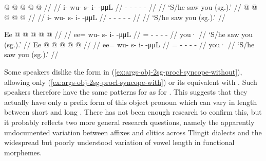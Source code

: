 \pex\label{exx:args-obj-2sg-pfx-syncope}%
\a\label{ex:args-obj-2sg-pfx-syncope-with}%
\exmn{= \ref{exx:args-obj-1pl-sync-2sg}}%
%
\begingl
	\gla	{} @ {} @ {} @ {} @ {} @ {} //
	\glp	\llap{[}\rlap{\ipa{ʔì\gm{w}.sì.ˈtʰìːn}]} {} {} {} {} {} //
	\glb	i- wu- s- i-  -μμL //
	\glc	{}- - - -  - //
	\gld	{} {} {} {} {} {} //
	\glft	‘S/he saw you (sg.).’
		//
\endgl
\a\label{ex:args-obj-2sg-pfx-syncope-without}%
%
\ljudge{*}%
\begingl
	\gla	{} @ {} @ {} @ {} @ {} @ {} //
	\glp	\llap{[}\rlap{\ipa{ʔì.\gm{wù}.sì.ˈtʰìːn}]} {} {} {} {} {} //
	\glb	i- wu- s- i-  -μμL //
	\glc	{}- - - -  - //
	\gld	{} {} {} {} {} {} //
	\glft	‘S/he saw you (sg.).’
		//
\endgl
\xe

\pex\label{exx:args-obj-2sg-procl-syncope}%
\a\label{ex:args-obj-2sg-procl-syncope-with}%
%
\begingl
	\gla	Ee @  @ {} @ {} @ {} @ {} //
	\glp	\llap{[}\rlap{\ipa{ʔìː\gm{w}.sì.ˈtʰìːn}]} {} {} {} {} //
	\glb	ee= wu- s- i-  -μμL //
	\glc	{}= - - -  - //
	\gld	you·  {} {} {} {} //
	\glft	‘S/he saw you (sg.).’
		//
\endgl
\a\label{ex:args-obj-2sg-procl-syncope-without}%
%
\begingl
	\gla	Ee @  @ {} @ {} @ {} @ {} //
	\glp	\llap{[}\rlap{\ipa{ʔìː.\gm{wù}.sì.ˈtʰìːn}]} {} {} {} {} //
	\glb	ee= wu- s- i-  -μμL //
	\glc	{}= - - -  - //
	\gld	you·  {} {} {} {} //
	\glft	‘S/he saw you (sg.).’
		//
\endgl
\xe

Some speakers dislike the form in (\ref{ex:args-obj-2sg-procl-syncope-without}), allowing only (\ref{ex:args-obj-2sg-procl-syncope-with}) or its equivalent with . Such speakers therefore have the same patterns for  as for . This suggests that they actually have only a prefix form of this object pronoun which can vary in length between short  and long . There has not been enough research to confirm this, but it probably reflects two more general research questions, namely the apparently undocumented variation between affixes and clitics across Tlingit dialects and the widespread but poorly understood variation of vowel length in functional morphemes.

